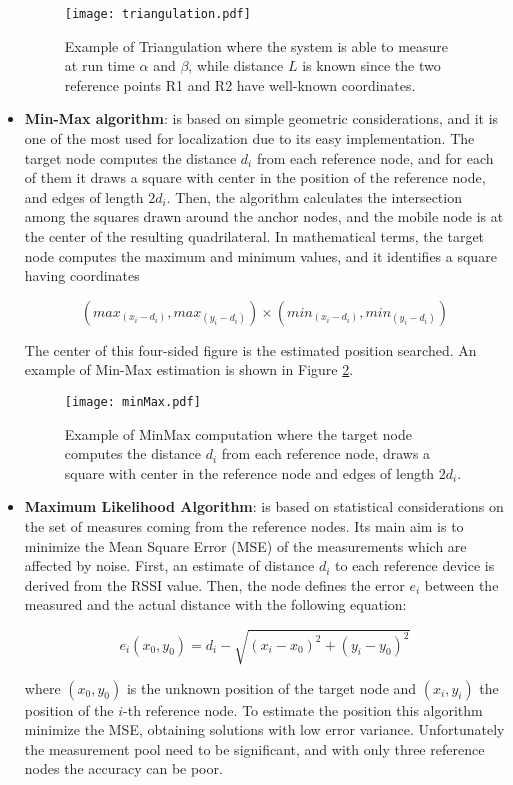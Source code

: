 \begin{itemize}
\begin{figure}[h!tb]
\centering\texttt{[image: triangulation.pdf]}
\caption[Example of Triangulation of a target node $T$]{Example of Triangulation where the system is able to measure at run time $\alpha$ and $\beta$, while distance $L$ is known since the two reference points R1 and R2 have well-known coordinates.}
\label{fig:triangulation}
\end{figure}


\item \textbf{Min-Max algorithm}: is based on simple geometric considerations, and it is one of the most used for localization due to its easy implementation. The target node computes the distance $d_i$ from each reference node, and for each of them it draws a square with center in the position of the reference node, and edges of length $2d_i$. Then, the algorithm calculates the intersection among the squares drawn around the anchor nodes, and the mobile node is at the center of the resulting quadrilateral. In mathematical terms, the target node computes the maximum and minimum values, and it identifies a square having coordinates

\begin{equation}\label{eq:minMax}
(max_{(x_i - d_i)}, max_{(y_i - d_i)}) \times (min_{(x_i - d_i)}, min_{(y_i - d_i)})
\end{equation}

The center of this four-sided figure is the estimated position searched. An example of Min-Max estimation is shown in Figure \ref{fig:minmax}.

\begin{figure}[h!tb]
\centering\texttt{[image: minMax.pdf]}
\caption[Example of MinMax computation]{Example of MinMax computation where the target node computes the distance $d_i$ from each reference node, draws a square with center in the reference node and edges of length $2d_i$. }
\label{fig:minmax}
\end{figure}

\item \textbf{Maximum Likelihood Algorithm}: is based on statistical considerations on the set of measures coming from the reference nodes. Its main aim is to minimize the Mean Square Error (MSE) of the measurements which are affected by noise. First, an estimate of distance $d_i$ to each reference device is derived from the RSSI value. Then, the node defines the error $e_i$ between the measured and the actual distance with the following equation:

\begin{equation}\label{eq:maxLike}
e_i(x_0, y_0) = d_i - \sqrt{(x_i - x_0)^2 + (y_i - y_0)^2}
\end{equation}

where $(x_0, y_0)$ is the unknown position of the target node and $(x_i,y_i)$ the position of the $i$-th reference node. To estimate the position this algorithm minimize the MSE, obtaining solutions with low error variance. Unfortunately the measurement pool need to be significant, and with only three reference nodes the accuracy can be poor.
\end{itemize}

